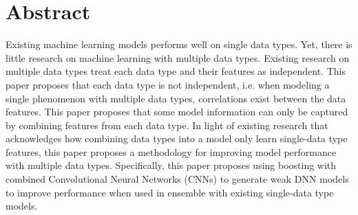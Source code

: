 

\section{Abstract}

Existing machine learning models performs well on single data types.  Yet, there is little research on machine learning with multiple data types.  Existing research on multiple data types treat each data type and their features as independent.  This paper proposes that each data type is not independent, i.e. when modeling a single phenomenon with multiple data types, correlations exist between the data features. This paper proposes that some model information can only be captured by combining features from each data type.  In light of existing research that acknowledges how combining data types into a model only learn single-data type features, this paper proposes a methodology for improving model performance with multiple data types.  Specifically, this paper proposes using boosting with combined Convolutional Neural Networks (CNNs) to generate weak DNN models to improve performance when used in ensemble with existing single-data type models.












